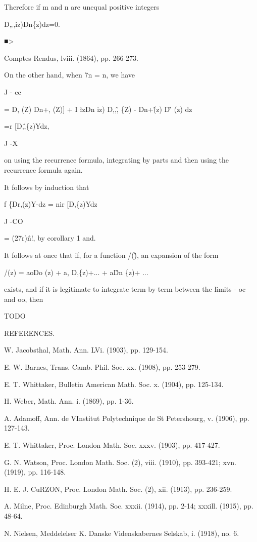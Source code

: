 Therefore if m and n are unequal positive integers

D„,iz)Dn\{z)dz=0.

■>

Comptes Rendus, lviii. (1864), pp. 266-273.

%
%

On the other hand, when 7n = n, we have

J - cc

= D, (Z) Dn+, (Z)] + I \l zDn iz) D,,\^, \{Z) - Dn+\^ (z) D\^' (z) dz

=r [D,\^,\{z)Ydz,

J -X

on using the recurrence formula, integrating by parts and then using
the recurrence formula again.

It follows by induction that

f \{Dr,(z)Y-dz = nir [D,\{z)Ydz

J -CO

= (27r)\^n!, by corollary 1 and.

It follows at once that if, for a function /(\^), an expansion of the
form

/(z) = aoDo (z) + a, D,\{z)+... + a\^Dn \{z)+ ...

exists, and if it is legitimate to integrate term-by-term between the
limits - oc and oo, then

TODO

REFERENCES.

W. Jacobsthal, Math. Ann. LVi. (1903), pp. 129-154.

E. W. Barnes, Trans. Camb. Phil. Soe. xx. (1908), pp. 253-279.

E. T. Whittaker, Bulletin American Math. Soc. x. (1904), pp. 125-134.

H. Weber, Math. Ann. i. (1869), pp. 1-36.

A. Adamoff, Ann. de VInstitut Polytechnique de St Petershourg, v.
(1906), pp. 127-143.

E. T. Whittaker, Proc. London Math. Soc. xxxv. (1903), pp. 417-427.

G. N. Watson, Proc. London Math. Soc. (2), viii. (1910), pp. 393-421;
xvn. (1919), pp. 116-148.

H. E. J. CuRZON, Proc. London Math. Soc. (2), xii. (1913), pp.
236-259.

A. Milne, Proc. Edinburgh Math. Soc. xxxii. (1914), pp. 2-14; xxxill.
(1915), pp. 48-64.

N. Nielsen, Meddelelser K. Danske Videnskabernes Selskab, i. (1918),
no. 6.

